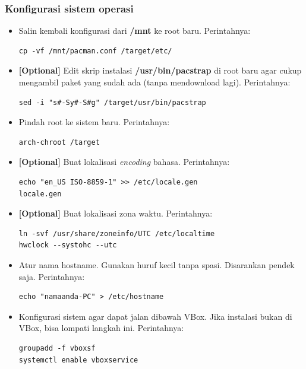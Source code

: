 \documentclass[12pt,]{article}
\begin{document}
	\subsubsection{Konfigurasi sistem operasi}
	\begin{itemize}
		\item Salin kembali konfigurasi dari \textbf{/mnt} ke root baru.
		Perintahnya:
		\begin{verbatim}
cp -vf /mnt/pacman.conf /target/etc/	
		\end{verbatim}	
		
		\item \textbf{[Optional]} Edit skrip instalasi \textbf{/usr/bin/pacstrap} di root baru agar cukup mengambil paket yang sudah ada (tanpa mendownload lagi).
		Perintahnya:
		\begin{verbatim}
sed -i "s#-Sy#-S#g" /target/usr/bin/pacstrap	
		\end{verbatim}
		
		\item Pindah root ke sistem baru.
		Perintahnya:
		\begin{verbatim}
arch-chroot /target
		\end{verbatim}
		
		\item \textbf{[Optional]} Buat lokalisasi \textit{encoding} bahasa.
		Perintahnya:
		\begin{verbatim}
echo "en_US ISO-8859-1" >> /etc/locale.gen
locale.gen
		\end{verbatim}
		
		\item \textbf{[Optional]} Buat lokalisasi zona waktu.
		Perintahnya:
		\begin{verbatim}
ln -svf /usr/share/zoneinfo/UTC /etc/localtime
hwclock --systohc --utc
		\end{verbatim}
		
		\item Atur nama hostname. Gunakan huruf kecil tanpa spasi.
		Disarankan pendek saja.
		Perintahnya:
		\begin{verbatim}
echo "namaanda-PC" > /etc/hostname
		\end{verbatim}
		
		\item Konfigurasi sistem agar dapat jalan dibawah VBox.
		Jika instalasi bukan di VBox, bisa lompati langkah ini.
		Perintahnya:
		\begin{verbatim}
groupadd -f vboxsf
systemctl enable vboxservice
		\end{verbatim}
		

\end{itemize}
\end{document}
